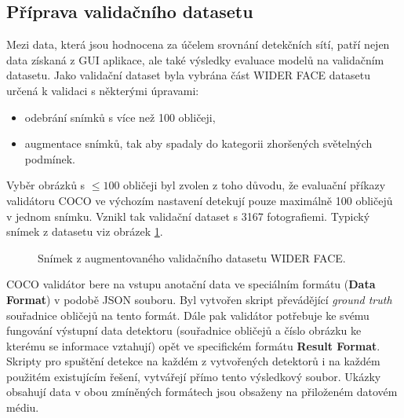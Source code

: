 \subsection*{Příprava validačního datasetu}
Mezi data, která jsou hodnocena za účelem srovnání detekčních sítí, patří nejen data získaná z GUI aplikace, ale také výsledky evaluace modelů na validačním datasetu. Jako validační dataset byla vybrána část WIDER FACE datasetu určená k validaci s některými úpravami:
\begin{itemize}
  \item odebrání snímků s více než 100 obličeji,
  \item augmentace snímků, tak aby spadaly do kategorii zhoršených světelných podmínek.
\end{itemize}

Vyběr obrázků s  $\le 100$ obličeji byl zvolen z toho důvodu, že evaluační příkazy validátoru COCO ve výchozím nastavení detekují pouze maximálně 100 obličejů v jednom snímku. Vznikl tak validační dataset s 3167 fotografiemi. Typický snímek z datasetu viz obrázek \ref{obrazek:valdataset}.

\begin{figure}[H] 
  \begin{center}
  \label{obrazek:valdataset}
  \caption{Snímek z augmentovaného validačního datasetu WIDER FACE.}
  \end{center}
\end{figure}

COCO validátor bere na vstupu anotační data ve speciálním formátu (\textbf{Data Format}) v podobě JSON souboru. Byl vytvořen skript převádějící \emph{ground truth} souřadnice obličejů na tento formát. Dále pak validátor potřebuje ke svému fungování výstupní data detektoru (souřadnice obličejů a číslo obrázku ke kterému se informace vztahují) opět ve specifickém formátu \textbf{Result Format}. Skripty pro spuštění detekce na každém z vytvořených detektorů i na každém použitém existujícím řešení, vytvářejí přímo tento výsledkový soubor. Ukázky obsahují data v obou zmíněných formátech jsou obsaženy na přiloženém datovém médiu.

